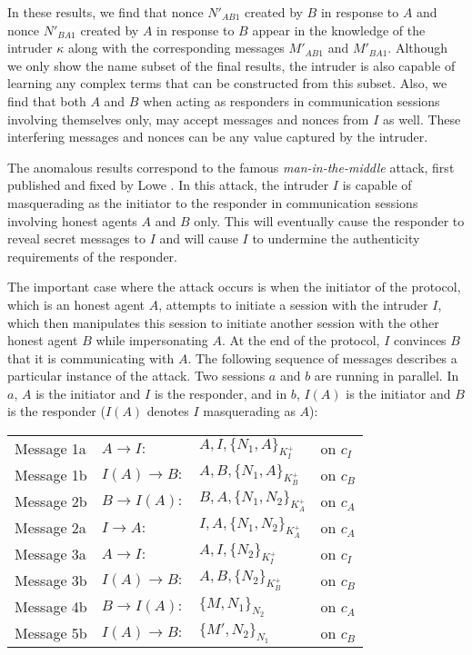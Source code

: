 \documentclass[10pt,a4paper,final,oneside,fleqn]{book}
\begin{document}
In these results, we find that nonce $N'_{AB1}$ created by $B$ in response to $A$ and nonce $N'_{BA1}$ created by $A$ in response to $B$ appear in the knowledge of the intruder $\kappa$ along with the corresponding messages $M'_{AB1}$ and $M'_{BA1}$.  Although we only show the name subset of the final results, the intruder is also capable of learning any complex terms that can be constructed from this subset.  Also, we find that both $A$ and $B$ when acting as responders in communication sessions involving themselves only, may accept messages and nonces from $I$ as well.  These interfering messages and nonces can be any value captured by the intruder.

The anomalous results correspond to the famous {\itshape man-in-the-middle\/} attack, first published and fixed by Lowe \cite{lowe1}.  In this attack, the intruder $I$ is capable of masquerading as the initiator to the responder in communication sessions involving honest agents $A$ and $B$ only.  This will eventually cause the responder to reveal secret messages to $I$ and will cause $I$ to undermine the authenticity requirements of the responder.

The important case where the attack occurs is when the initiator of the protocol, which is an honest agent $A$, attempts to initiate a session with the intruder $I$, which then manipulates this session to initiate another session with the other honest agent $B$ while impersonating $A$.  At the end of the protocol, $I$ convinces $B$ that it is communicating with $A$.  The following sequence of messages describes a particular instance of the attack. Two sessions $a$ and $b$ are running in parallel. In $a$, $A$ is the initiator and $I$ is the responder, and in $b$, $I(A)$ is the initiator and $B$ is the responder ($I(A)$ denotes $I$ masquerading as $A$):\vspace{5mm}

\begin{tabular}{llll}
Message 1a&\hspace{5mm}$A\to I:$&$A,I,\{N_1,A\}_{K^+_I}$&on $c_{I}$\\
Message 1b&\hspace{5mm}$I(A)\to B:$&$A,B,\{N_1,A\}_{K^+_B}$&on $c_{B}$\\
Message 2b&\hspace{5mm}$B\to I(A):$&$B,A,\{N_1,N_2\}_ {K^+_A}$&on $c_{A}$\\
Message 2a&\hspace{5mm}$I\to A:$&$I,A,\{N_1,N_2\}_ {K^+_A}$&on $c_{A}$\\
Message 3a&\hspace{5mm}$A\to I:$&$A,I,\{N_2\}_ {K^+_I}$&on $c_{I}$\\
Message 3b&\hspace{5mm}$I(A)\to B:$&$A,B,\{N_2\}_{K^+_B}$&on $c_{B}$\\
Message 4b&\hspace{5mm}$B\to I(A):$&$\{M,N_1\}_{N_2}$&on $c_{A}$\\
Message 5b&\hspace{5mm}$I(A)\to B:$&$\{M',N_2\}_{N_1}$&on $c_{B}$
\end{tabular}\vspace{5mm}
\end{document}

